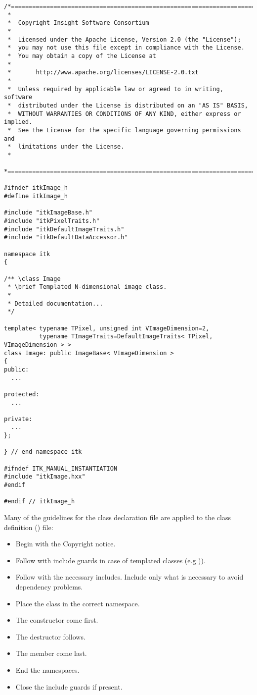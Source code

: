 \small
\begin{verbatim}
/*=========================================================================
 *
 *  Copyright Insight Software Consortium
 *
 *  Licensed under the Apache License, Version 2.0 (the "License");
 *  you may not use this file except in compliance with the License.
 *  You may obtain a copy of the License at
 *
 *       http://www.apache.org/licenses/LICENSE-2.0.txt
 *
 *  Unless required by applicable law or agreed to in writing, software
 *  distributed under the License is distributed on an "AS IS" BASIS,
 *  WITHOUT WARRANTIES OR CONDITIONS OF ANY KIND, either express or implied.
 *  See the License for the specific language governing permissions and
 *  limitations under the License.
 *
 *=========================================================================*/

#ifndef itkImage_h
#define itkImage_h

#include "itkImageBase.h"
#include "itkPixelTraits.h"
#include "itkDefaultImageTraits.h"
#include "itkDefaultDataAccessor.h"

namespace itk
{

/** \class Image
 * \brief Templated N-dimensional image class.
 *
 * Detailed documentation...
 */

template< typename TPixel, unsigned int VImageDimension=2,
          typename TImageTraits=DefaultImageTraits< TPixel, VImageDimension > >
class Image: public ImageBase< VImageDimension >
{
public:
  ...

protected:
  ...

private:
  ...
};

} // end namespace itk

#ifndef ITK_MANUAL_INSTANTIATION
#include "itkImage.hxx"
#endif

#endif // itkImage_h
\end{verbatim}
\normalsize

Many of the guidelines for the class declaration file are applied to the class
definition () file:
\begin{itemize}
\item Begin with the Copyright notice.
\item Follow with include guards in case of templated classes (e.g
)).
\item Follow with the necessary includes. Include only what is necessary to
avoid dependency problems.
\item Place the class in the correct namespace.
\item The constructor come first.
\item The destructor follows.
\item The  member come last.
\item End the namespaces.
\item Close the include guards if present.
\end{itemize}

